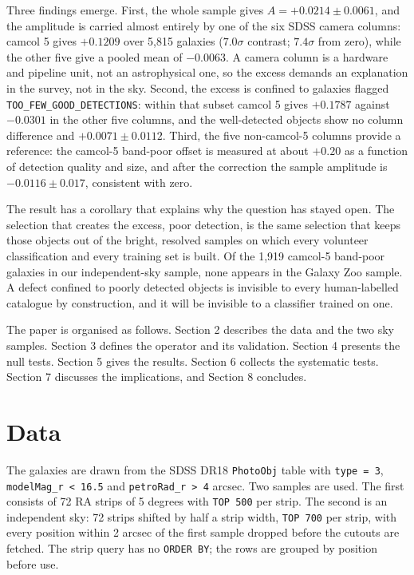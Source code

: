 \documentclass[preprint,12pt,authoryear]{elsarticle}
\newcommand{\toofew}{\texttt{TOO\_\allowbreak FEW\_\allowbreak GOOD\_\allowbreak DETECTIONS}}
\begin{document}
Three findings emerge. First, the whole sample gives $A = +0.0214 \pm 0.0061$, and the amplitude is
carried almost entirely by one of the six SDSS camera columns: camcol 5 gives $+0.1209$ over 5,815
galaxies ($7.0\sigma$ contrast; $7.4\sigma$ from zero), while the other five give a
pooled mean of $-0.0063$. A camera column is a hardware and pipeline unit, not an astrophysical
one, so the excess demands an explanation in the survey, not in the sky. Second, the excess is
confined to galaxies flagged \toofew: within that subset camcol 5 gives
$+0.1787$ against $-0.0301$ in the other five columns, and the well-detected objects show no
column difference and $+0.0071 \pm 0.0112$. Third, the five non-camcol-5 columns provide a reference:
the camcol-5 band-poor offset is measured at about $+0.20$ as a function of detection quality and
size, and after the correction the sample amplitude is $-0.0116 \pm 0.017$, consistent with zero.

The result has a corollary that explains why the question has stayed open. The selection that
creates the excess, poor detection, is the same selection that keeps those objects out of the
bright, resolved samples on which every volunteer classification and every training set is built.
Of the 1,919 camcol-5 band-poor galaxies in our independent-sky sample, none appears in the Galaxy
Zoo sample. A defect confined to poorly detected objects is invisible to every human-labelled
catalogue by construction, and it will be invisible to a classifier trained on one.

The paper is organised as follows. Section 2 describes the data and the two sky samples. Section 3
defines the operator and its validation. Section 4 presents the null tests. Section 5 gives the
results. Section 6 collects the systematic tests. Section 7 discusses the implications, and
Section 8 concludes.

\section{Data}

The galaxies are drawn from the SDSS DR18 \texttt{PhotoObj} table with \texttt{type = 3},
\texttt{modelMag\_r < 16.5} and \texttt{petroRad\_r > 4} arcsec. Two samples are used. The first
consists of 72 RA strips of 5 degrees with \texttt{TOP 500} per strip. The second is an independent
sky: 72 strips shifted by half a strip width, \texttt{TOP 700} per strip, with every position
within 2 arcsec of the first sample dropped before the cutouts are fetched. The strip query has no
\texttt{ORDER BY}; the rows are grouped by position before use.
\end{document}
